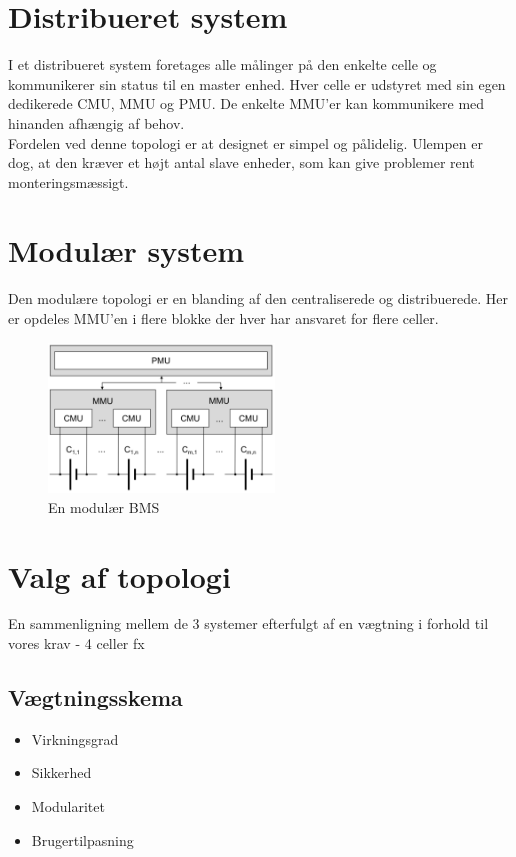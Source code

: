 \section{Distribueret system}
I et distribueret system foretages alle målinger på den enkelte celle og kommunikerer sin status til en master enhed. Hver celle er udstyret med sin egen dedikerede CMU, MMU og PMU. De enkelte MMU'er kan kommunikere med hinanden afhængig af behov.
\\

Fordelen ved denne topologi er at designet er simpel og pålidelig. Ulempen er dog, at den kræver et højt antal slave enheder, som kan give problemer rent monteringsmæssigt.

\section{Modulær system}
Den modulære topologi er en blanding af den centraliserede og distribuerede. Her er opdeles MMU'en i flere blokke der hver har ansvaret for flere celler. 

\begin{figure}[h]
	\centering
	\includegraphics[width=6cm]{billeder/modular.png}
	\caption{En modulær BMS}
	\label{fig:modular_BMS}
\end{figure}


\section{Valg af topologi}
En sammenligning mellem de 3 systemer efterfulgt af en vægtning i forhold til vores krav - 4 celler fx
\subsection{Vægtningsskema}

\begin{itemize}
	\item Virkningsgrad
	\item Sikkerhed
	\item Modularitet
	\item Brugertilpasning
\end{itemize}